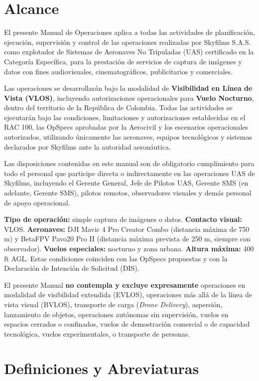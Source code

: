 \section{Alcance}
El presente Manual de Operaciones aplica a todas las actividades de planificación, ejecución, supervisión y control de las operaciones realizadas por Skyfilms S.A.S. como explotador de Sistemas de Aeronaves No Tripuladas (UAS) certificado en la Categoría Específica, para la prestación de servicios de captura de imágenes y datos con fines audiovisuales, cinematográficos, publicitarios y comerciales.

Las operaciones se desarrollarán bajo la modalidad de \textbf{Visibilidad en Línea de Vista (VLOS)}, incluyendo autorizaciones operacionales para \textbf{Vuelo Nocturno}, dentro del territorio de la República de Colombia. Todas las actividades se ejecutarán bajo las condiciones, limitaciones y autorizaciones establecidas en el RAC 100, las OpSpecs aprobadas por la Aerocivil y los escenarios operacionales autorizados, utilizando únicamente las aeronaves, equipos tecnológicos y sistemas declarados por Skyfilms ante la autoridad aeronáutica.

Las disposiciones contenidas en este manual son de obligatorio cumplimiento para todo el personal que participe directa o indirectamente en las operaciones UAS de Skyfilms, incluyendo el Gerente General, Jefe de Pilotos UAS, Gerente SMS (en adelante, Gerente SMS), pilotos remotos, observadores visuales y demás personal de apoyo operacional.

\textbf{Tipo de operación:} simple captura de imágenes o datos. \textbf{Contacto visual:} VLOS. \textbf{Aeronaves:} DJI Mavic 4 Pro Creator Combo (distancia máxima de 750 m) y BetaFPV Pavo20 Pro II (distancia máxima prevista de 250 m, siempre con observador). \textbf{Vuelos especiales:} nocturno y zona urbana. \textbf{Altura máxima:} 400 ft AGL. Estas condiciones coinciden con las OpSpecs propuestas y con la Declaración de Intención de Solicitud (DIS).

El presente Manual \textbf{no contempla y excluye expresamente} operaciones en modalidad de visibilidad extendida (EVLOS), operaciones más allá de la línea de vista visual (BVLOS), transporte de carga (\textit{Drone Delivery}), aspersión, lanzamiento de objetos, operaciones autónomas sin supervisión, vuelos en espacios cerrados o confinados, vuelos de demostración comercial o de capacidad tecnológica, vuelos experimentales, o transporte de personas.


\section{Definiciones y Abreviaturas}

